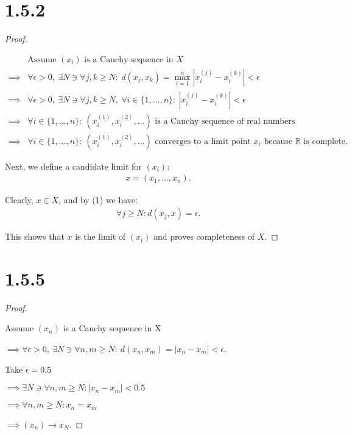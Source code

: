 \documentclass{article}
\begin{document}
\section*{1.5.2}
\begin{proof}
  $ $
  
  \setcounter{equation}{0}
  \begin{align}
    &\text{Assume } (x_i) \text{ is a Cauchy sequence in } X \nonumber \\
    \implies& \forall \epsilon > 0, \: \exists N \ni \forall j,k \geq N: \: 
    d(x_j, x_k) = \max_{i=1}^{n} |x^{(j)}_i - x^{(k)}_i| < \epsilon \\
    \implies& \forall \epsilon > 0, \: \exists N \ni \forall j,k \geq N, \: \forall i \in \{1,\ldots, n\}: 
    \:
    |x^{(j)}_i - x^{(k)}_i| < \epsilon \nonumber \nonumber \\
    \implies& \forall i \in \{1,\ldots, n\}: \: (x^{(1)}_i, x^{(2)}_i, \ldots) \text{ is a Cauchy sequence of real numbers} \nonumber \\
    \implies& \forall i \in \{1,\ldots, n\}: \: (x^{(1)}_i, x^{(2)}_i, \ldots) \text{ converges to a limit point } x_i \text{ because } \mathbb{R} \text{ is complete.} \nonumber
  \end{align}

  Next, we define a candidate limit for $(x_i)$:
  \begin{align*}
    x = (x_1, \ldots, x_n).
  \end{align*}

  Clearly, $x \in X$, and by (1) we have: 
  \begin{align*}
    \forall j \geq N: d(x_j, x) = \epsilon.
  \end{align*}

  This shows that $x$ is the limit of $(x_i)$ and proves completeness of $X$.

\end{proof}

\section*{1.5.5}
\begin{proof}
  $ $
  
  Assume $(x_n)$ is a Cauchy sequence in X

  \noindent
  $\implies \forall \epsilon > 0, 
  \: \exists N \ni \forall n,m \geq N:  
  \: d(x_n, x_m) = |x_n - x_m| < \epsilon$.
  \newline

  Take $\epsilon = 0.5$
  
  \noindent
  $\implies \exists N \ni \forall n,m \geq N: |x_n - x_m| < 0.5$

  \noindent
  $\implies \forall n,m \geq N: x_n = x_m$

  \noindent
  $\implies (x_n) \longrightarrow x_N$.

\end{proof}
\end{document}
